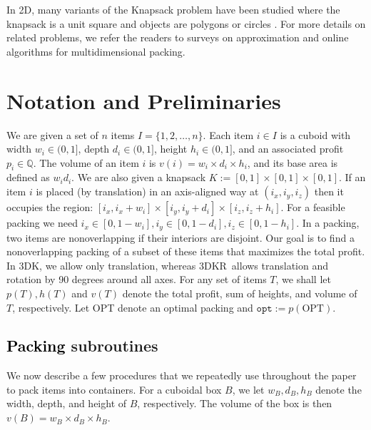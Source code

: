 \documentclass[10pt,a4paper]{amsart}
\newcommand{\kvnnew}[1]{\textcolor{black}{#1}}
\newcommand{\tdk}{\textsc{3DK}}
\newcommand{\tdkr}{\textsc{3DKR}}
\newcommand{\boxes}{containers\xspace}
\theoremstyle{definition}
\newcommand{\opt}{\mathtt{opt}}
\begin{document}
In 2D, many variants of the Knapsack problem have been studied where the knapsack is a unit square and objects are polygons \cite{MerinoW20} or circles \cite{AcharyaBG0MW24, ChagasNew}. 
For more details on related problems, we refer the readers to surveys \cite{alt2016computational, CKPT17} on approximation and online algorithms for multidimensional packing.



\section{Notation and Preliminaries}
\label{sec:prelim}
We are given a set of $n$ items $I=\{1, 2, \dots, n\}$.
Each item $i \in I$ is a cuboid with width $w_i \in (0,1]$, depth $d_i \in (0,1]$, height $h_i \in (0,1]$, and  an associated profit $p_i \in \mathbb{Q}$.
The volume of an item $i$ is $v(i)=w_i \times d_i \times h_i$,
and its base area is defined as $w_id_i$.
We are also given a knapsack $K:=[0,1]\times [0,1] \times [0,1]$.
If an item $i$ is placed (by translation) in an axis-aligned way at $(i_x, i_y, i_z)$ then it occupies the region: $[i_x, i_x+w_i]\times [i_y, i_y+d_i] \times [i_z, i_z+h_i]$.
For a feasible packing we need $i_x \in [0, 1-w_i], i_y \in [0, 1-d_i], i_z \in [0, 1-h_i]$.
In a packing, two items are nonoverlapping if their interiors are disjoint. 
Our goal is to find a nonoverlapping packing of a subset of these items that maximizes the total profit.
In \tdk, we allow only translation, whereas \tdkr~allows translation and rotation by 90 degrees around all axes.
For any set of items $T$, we shall let $p(T), h(T)$ and $v(T)$ denote the total profit, sum of heights, and volume of $T$, respectively. Let OPT denote an optimal packing and $\opt := p(\text{OPT})$.
\subsection{\kvnnew{Packing} subroutines}
\label{sec:subroutines}
We now describe a few procedures that we repeatedly use throughout the paper to pack items into \boxes. For a cuboidal box $B$, we let $w_B, d_B, h_B$ denote the width, depth, and height of $B$, respectively. The volume of the box is then $v(B) = w_B \times d_B \times h_B$.
\end{document}
